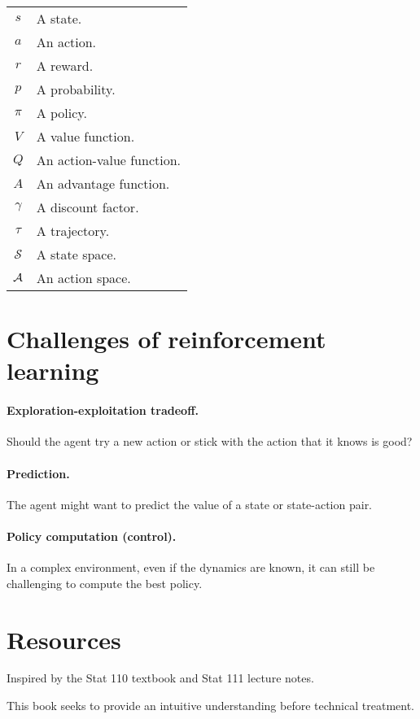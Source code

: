 \documentclass[../main/main]{subfiles}
\begin{document}
\begin{tabular}{cl}
    $s$ & A state. \\
    $a$ & An action. \\
    $r$ & A reward. \\
    $p$ & A probability. \\
    $\pi$ & A policy. \\
    $V$ & A value function. \\
    $Q$ & An action-value function. \\
    $A$ & An advantage function. \\
    $\gamma$ & A discount factor. \\
    $\tau$ & A trajectory. \\
    $\mathcal{S}$ & A state space. \\
    $\mathcal{A}$ & An action space.
\end{tabular}



\section{Challenges of reinforcement learning}

\paragraph{Exploration-exploitation tradeoff.} Should the agent try a new action or stick with the action that it knows is good?

\paragraph{Prediction.} The agent might want to predict the value of a state or state-action pair.

\paragraph{Policy computation (control).} In a complex environment, even if the dynamics are known, it can still be challenging to compute the best policy.


\section{Resources}

Inspired by the Stat 110 textbook and Stat 111 lecture notes.

This book seeks to provide an intuitive understanding before technical treatment.

\end{document}
